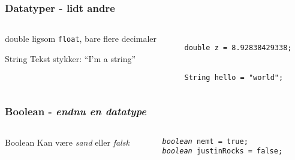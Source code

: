 \documentclass{beamer}
\begin{document}
\begin{frame}[fragile]
  \frametitle{Datatyper - lidt andre}
  \begin{columns}
    \begin{column}{0.4\textwidth}
      \begin{block}{double}
        ligsom \texttt{float}, bare flere decimaler
      \end{block}
      \begin{block}{String}
        Tekst stykker: ``I'm a string''
      \end{block}
    \end{column}
    \begin{column}{0.6\textwidth}    
\begin{verbatim}

double z = 8.92838429338;


String hello = "world";

\end{verbatim}

    \end{column}
  \end{columns}  
\end{frame}



\begin{frame}[fragile]
  \frametitle{Boolean - \emph{endnu en datatype}}
  \begin{columns}
    \begin{column}{0.4\textwidth}
      \begin{block}{Boolean}
        Kan være \emph{sand} eller \emph{falsk}
      \end{block}
    \end{column}
    \begin{column}{0.6\textwidth}    
      \texttt{\emph{boolean} nemt = true; }\\
      \texttt{\emph{boolean} justinRocks = false; }
    \end{column}
  \end{columns}  
\end{frame}
\end{document}
